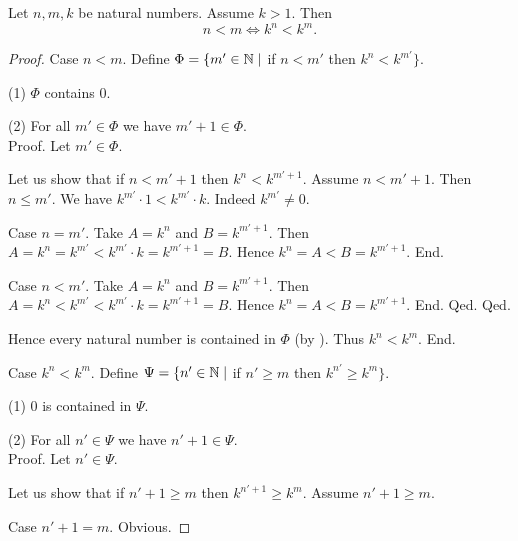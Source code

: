 \documentclass[10pt]{article}
\begin{document}
  \begin{forthel}
    \begin{proposition}
      Let $n, m, k$ be natural numbers.
      Assume $k > 1$.
      Then \[ n < m \iff k^{n} < k^{m}. \]
    \end{proposition}
    \begin{proof}
      Case $n < m$.
        Define $\Phi = \{ m' \in \mathbb{N} \mid$ if $n < m'$ then $k^{n} < k^{m'} \}$.

        (1) $\Phi$ contains $0$.

        (2) For all $m' \in \Phi$ we have $m' + 1 \in \Phi$. \\
        Proof.
          Let $m' \in \Phi$.

          Let us show that if $n < m' + 1$ then $k^{n} < k^{m' + 1}$.
            Assume $n < m' + 1$.
            Then $n \leq m'$.
            We have $k^{m'} \cdot 1 < k^{m'} \cdot k$.
            Indeed $k^{m'} \neq 0$.

            Case $n = m'$.
              Take $A = k^{n}$ and $B = k^{m' + 1}$. %
              Then $A
                = k^{n}
                = k^{m'}
                < k^{m'} \cdot k
                = k^{m' + 1}
                = B$.
              Hence $k^{n} = A < B = k^{m' + 1}$.
            End.

            Case $n < m'$.
              Take $A = k^{n}$ and $B = k^{m' + 1}$. %
              Then $A
                = k^{n}
                < k^{m'}
                < k^{m'} \cdot k
                = k^{m' + 1}
                = B$.
              Hence $k^{n} = A < B = k^{m' + 1}$.
            End.
          Qed.
        Qed.

        Hence every natural number is contained in $\Phi$ (by ).
        Thus $k^{n} < k^{m}$.
      End.

      Case $k^{n} < k^{m}$.
        Define $\Psi = \{ n' \in \mathbb{N} \mid$ if $n' \geq m$ then
        $k^{n'} \geq k^{m} \}$.

        (1) $0$ is contained in $\Psi$.

        (2) For all $n' \in \Psi$ we have $n' + 1 \in \Psi$. \\
        Proof.
          Let $n' \in \Psi$.

          Let us show that if $n' + 1 \geq m$ then $k^{n' + 1} \geq k^{m}$.
            Assume $n' + 1 \geq m$.

            Case $n' + 1 = m$. Obvious.


\end{proof}
\end{forthel}
\end{document}
